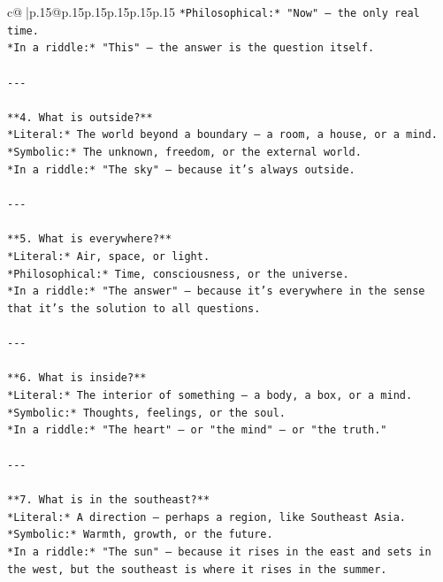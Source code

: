 \documentclass{article}
\begin{document}
{\begin{supertabular}{c@{$\;$}|p{.15\linewidth}@{}p{.15\linewidth}p{.15\linewidth}p{.15\linewidth}p{.15\linewidth}p{.15\linewidth}}
{{{\texttt{*Philosophical:* "Now" — the only real time.  } \\
\texttt{*In a riddle:* "This" — the answer is the question itself.} \\
\\ 
\texttt{{-}{-}{-}} \\
\\ 
\texttt{**4. What is outside?**  } \\
\texttt{*Literal:* The world beyond a boundary — a room, a house, or a mind.  } \\
\texttt{*Symbolic:* The unknown, freedom, or the external world.  } \\
\texttt{*In a riddle:* "The sky" — because it's always outside.} \\
\\ 
\texttt{{-}{-}{-}} \\
\\ 
\texttt{**5. What is everywhere?**  } \\
\texttt{*Literal:* Air, space, or light.  } \\
\texttt{*Philosophical:* Time, consciousness, or the universe.  } \\
\texttt{*In a riddle:* "The answer" — because it's everywhere in the sense that it's the solution to all questions.} \\
\\ 
\texttt{{-}{-}{-}} \\
\\ 
\texttt{**6. What is inside?**  } \\
\texttt{*Literal:* The interior of something — a body, a box, or a mind.  } \\
\texttt{*Symbolic:* Thoughts, feelings, or the soul.  } \\
\texttt{*In a riddle:* "The heart" — or "the mind" — or "the truth."} \\
\\ 
\texttt{{-}{-}{-}} \\
\\ 
\texttt{**7. What is in the southeast?**  } \\
\texttt{*Literal:* A direction — perhaps a region, like Southeast Asia.  } \\
\texttt{*Symbolic:* Warmth, growth, or the future.  } \\
\texttt{*In a riddle:* "The sun" — because it rises in the east and sets in the west, but the southeast is where it rises in the summer.} \\
\\ 
}}}
\end{supertabular}}
\end{document}
